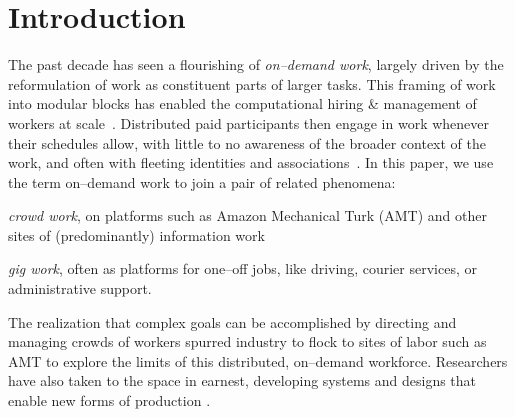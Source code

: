 \documentclass[trackingWork]{subfiles}
\begin{document}
\section{Introduction}\label{sec:introduction}

{The past decade has seen a flourishing of \textit{on--demand work},
largely driven by the reformulation of work as
constituent parts of larger tasks.}
This framing of work into modular blocks
has enabled the computational hiring \& management of workers at scale~\cite{howe2008crowdsourcing,Bigham2014,crowdworkFuture}.
Distributed paid participants then engage in work whenever their schedules allow,
with little to no awareness of the broader context of the work, and
often with fleeting identities and associations~\cite{martin2014being,uberAlgorithm}.
In this paper, we use the term on--demand work to join a pair of related phenomena:
\begin{numberlist}[itemjoin*={;~and~},itemjoin={;~}]
\item \textit{crowd work}, on platforms such as Amazon Mechanical Turk (AMT) and other sites of (predominantly) information work
\item \textit{gig work}, often as platforms for one--off jobs, like driving, courier services, or administrative support.
\end{numberlist}
The realization that complex goals can be accomplished by directing and managing crowds of workers spurred industry to flock to sites of labor
such as AMT to explore the limits of this distributed, on--demand workforce.
Researchers have also taken to the space in earnest,
developing systems and designs that enable new forms of production
\cite[e.g.][]{bernsteinSoylent,vizwiz,paolacci2010running}.
\end{document}
